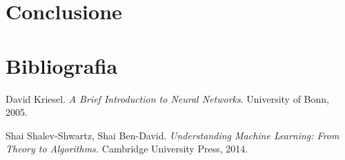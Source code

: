 \documentclass[12pt, twoside, letterpaper]{report}
\begin{document}
	\chapter*{Conclusione}	
	\chapter*{Bibliografia}
		\begin{enumerate}[label={[\arabic*]}]
			\item David Kriesel. \textit{A Brief Introduction to Neural Networks}. University of Bonn, 2005.
			\item Shai Shalev-Shwartz, Shai Ben-David. \textit{Understanding Machine Learning: From Theory to Algorithms.} Cambridge University Press, 2014.
		\end{enumerate}
	
\end{document}
